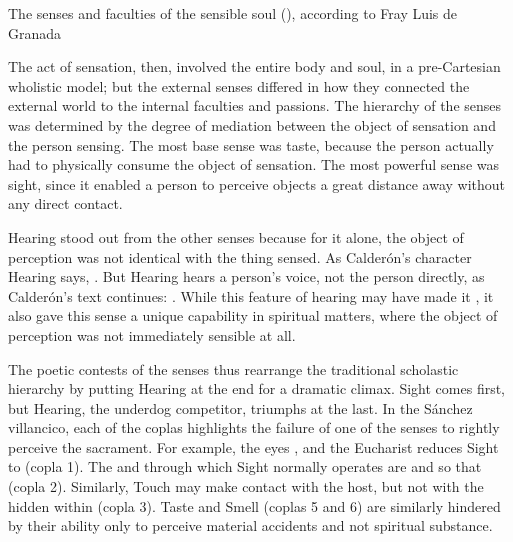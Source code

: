 \begin{table}
    \caption{The senses and faculties of the sensible soul (), according to Fray Luis de Granada}
    \label{table:senses-fray-luis}
\end{table}

The act of sensation, then, involved the entire body and soul, in a 
pre-Cartesian wholistic model; but the external senses differed in how they 
connected the external world to the internal faculties and passions.
The hierarchy of the senses was determined by the degree of mediation between 
the object of sensation and the person sensing.
The most base sense was taste, because the person actually had to physically 
consume the object of sensation.
The most powerful sense was sight, since it enabled a person to perceive 
objects a great distance away without any direct contact.

Hearing stood out from the other senses because for it alone, the object of 
perception was not identical with the thing sensed.
As Calderón's character Hearing says, .%
\Autocite[]{Calderon:Retiro}
But Hearing hears a person's voice, not the person directly, as Calderón's text 
continues: .%
\Autocite[]{Calderon:Retiro}
While this feature of hearing may have made it , it 
also gave this sense a unique capability in spiritual matters, where the object 
of perception was not immediately sensible at all.

The poetic contests of the senses thus rearrange the traditional scholastic 
hierarchy by putting Hearing at the end for a dramatic climax.
Sight comes first, but Hearing, the underdog competitor, triumphs at the last.
In the Sánchez villancico, each of the coplas highlights the failure of one of 
the senses to rightly perceive the sacrament.
For example, the eyes , and the Eucharist 
reduces Sight to  (copla 1).
The  and  through which Sight normally 
operates are   and 
 so that  (copla 2).
Similarly, Touch may make contact with the host, but not with the 
 hidden within (copla 3).
Taste and Smell (coplas 5 and 6) are similarly hindered by their ability only 
to perceive material accidents and not spiritual substance.

